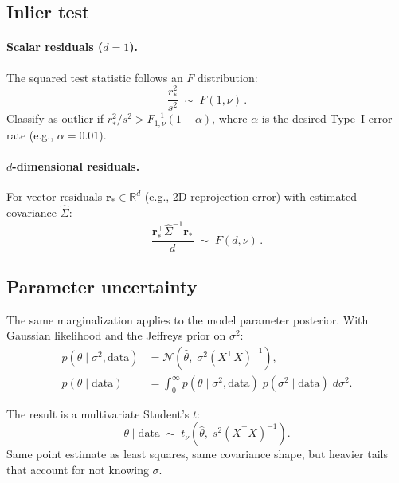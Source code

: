 \documentclass[11pt]{article}
\newcommand{\Normal}{\mathcal{N}}
\newcommand{\data}{\mathrm{data}}
\begin{document}
\subsection{Inlier test}
\label{sec:unknown-inlier}

\paragraph{Scalar residuals ($d = 1$).}
The squared test statistic follows an $F$ distribution:
\begin{equation}
  \boxed{\frac{r_*^2}{s^2} \;\sim\; F(1, \nu)\,.}
\end{equation}
Classify as outlier if
$r_*^2 / s^2 > F_{1,\nu}^{-1}(1 - \alpha)$,
where $\alpha$ is the desired Type~I error rate (e.g., $\alpha = 0.01$).

\paragraph{$d$-dimensional residuals.}
For vector residuals $\mathbf{r}_* \in \mathbb{R}^d$ (e.g., 2D reprojection error)
with estimated covariance $\hat\Sigma$:
\begin{equation}
  \boxed{
    \frac{\mathbf{r}_*^\top \hat\Sigma^{-1} \mathbf{r}_*}{d}
    \;\sim\; F(d, \nu)\,.
  }
\end{equation}

\subsection{Parameter uncertainty}
\label{sec:unknown-param}

The same marginalization applies to the model parameter posterior.
With Gaussian likelihood and the Jeffreys prior on $\sigma^2$:
\begin{align}
  p(\theta \mid \sigma^2, \data)
    &= \Normal\!\left(\hat\theta,\; \sigma^2 (X^\top X)^{-1}\right), \\[4pt]
  p(\theta \mid \data)
    &= \int_0^\infty p(\theta \mid \sigma^2, \data)\;
       p(\sigma^2 \mid \data)\; d\sigma^2.
\end{align}

The result is a multivariate Student's $t$:
\begin{equation}
  \boxed{\theta \mid \data \;\sim\;
    t_\nu\!\left(\hat\theta,\; s^2 (X^\top X)^{-1}\right).}
\end{equation}
Same point estimate as least squares, same covariance shape,
but heavier tails that account for not knowing $\sigma$.
\end{document}
